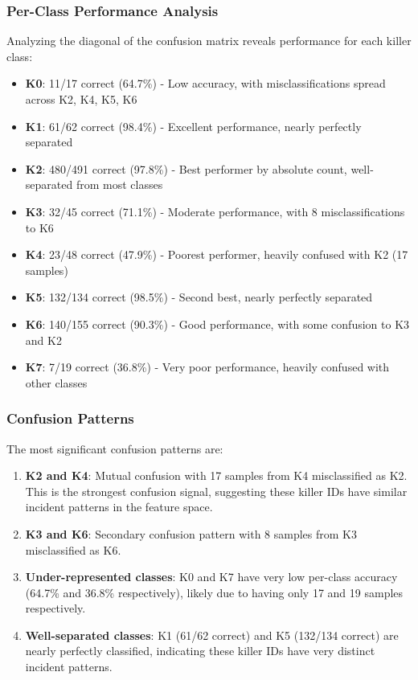 \documentclass[12pt]{article}
\begin{document}
\subsubsection{Per-Class Performance Analysis}

Analyzing the diagonal of the confusion matrix reveals performance for each killer class:

\begin{itemize}
    \item \textbf{K0}: 11/17 correct (64.7\%) - Low accuracy, with misclassifications spread across K2, K4, K5, K6
    \item \textbf{K1}: 61/62 correct (98.4\%) - Excellent performance, nearly perfectly separated
    \item \textbf{K2}: 480/491 correct (97.8\%) - Best performer by absolute count, well-separated from most classes
    \item \textbf{K3}: 32/45 correct (71.1\%) - Moderate performance, with 8 misclassifications to K6
    \item \textbf{K4}: 23/48 correct (47.9\%) - Poorest performer, heavily confused with K2 (17 samples)
    \item \textbf{K5}: 132/134 correct (98.5\%) - Second best, nearly perfectly separated
    \item \textbf{K6}: 140/155 correct (90.3\%) - Good performance, with some confusion to K3 and K2
    \item \textbf{K7}: 7/19 correct (36.8\%) - Very poor performance, heavily confused with other classes
\end{itemize}

\subsubsection{Confusion Patterns}

The most significant confusion patterns are:

\begin{enumerate}
    \item \textbf{K2 and K4}: Mutual confusion with 17 samples from K4 misclassified as K2. This is the strongest confusion signal, suggesting these killer IDs have similar incident patterns in the feature space.
    \item \textbf{K3 and K6}: Secondary confusion pattern with 8 samples from K3 misclassified as K6.
    \item \textbf{Under-represented classes}: K0 and K7 have very low per-class accuracy (64.7\% and 36.8\% respectively), likely due to having only 17 and 19 samples respectively.
    \item \textbf{Well-separated classes}: K1 (61/62 correct) and K5 (132/134 correct) are nearly perfectly classified, indicating these killer IDs have very distinct incident patterns.
\end{enumerate}
\end{document}
